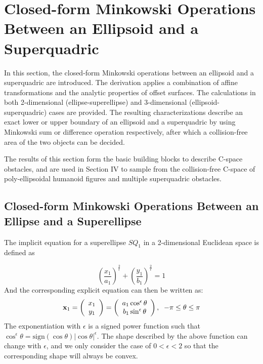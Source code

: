 \documentclass[]{article}
\begin{document}
\section{Closed-form Minkowski Operations Between an Ellipsoid and a Superquadric} \label{mink-es}
In this section, the closed-form Minkowski operations between an ellipsoid and a superquadric are introduced. The derivation applies a combination of affine transformations and the analytic properties of offset surfaces. The calculations in both 2-dimensional (ellipse-superellipse) and 3-dimensional (ellipsoid-superquadric) cases are provided. The resulting characterizations describe an exact lower or upper boundary of an ellipsoid and a superquadric by using Minkowski sum or difference operation respectively, after which a collision-free area of the two objects can be decided.

The results of this section form the basic building blocks to describe C-space obstacles, and are used
in Section IV to sample from the collision-free C-space of poly-ellipsoidal humanoid figures and multiple
superquadric obstacles.

\subsection{Closed-form Minkowski Operations Between an Ellipse and a Superellipse}
The implicit equation for a superellipse $SQ_1$ in a 2-dimensional Euclidean space is defined as

\begin{equation}
\left(\dfrac{x_1}{a_1} \right)^{\frac{2}{\epsilon}} + \left( \dfrac{y_1}{b_1}\right)^{\frac{2}{\epsilon}} = 1
\label{2dsq}
\end{equation}
And the corresponding explicit equation can then be written as:
\begin{equation}
{\bf x}_1 = \left(
\begin{array}{c}
x_1 \\ y_1
\end{array}
\right)
=
\left(
\begin{array}{c}
a_1 \cos^{\epsilon}\theta \\
b_1 \sin^{\epsilon}\theta
\end{array}
\right)
, \; \;
-\pi \leq \theta \leq \pi
\label{sq2de}
\end{equation}
The exponentiation with $\epsilon$ is a signed power function such that $\cos^{\epsilon}\theta = \text{sign}(\cos\theta)|\cos\theta|^{\epsilon}$. The shape described by the above function can change with $\epsilon$, and we only consider the case of $0 < \epsilon < 2$ so that the corresponding shape will always be convex.
\end{document}
